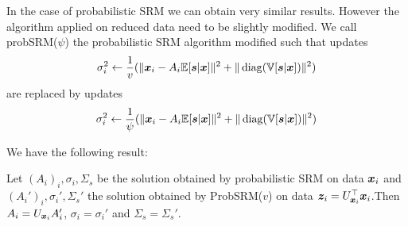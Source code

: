 In the case of probabilistic SRM we can obtain very similar results. However the
algorithm applied on reduced data need to be slightly modified.
We call probSRM($\psi$) the probabilistic SRM algorithm modified such that
updates
\begin{align}
\sigma_i^2 \leftarrow \frac1{v} (\| \boldsymbol{x}_i - A_i \mathbb{E}[\boldsymbol{s}|\boldsymbol{x}]\|^2 + \| \operatorname*{diag}(\mathbb{V}[\boldsymbol{s} | \boldsymbol{x}]) \|^2)
\end{align}
are replaced by updates
\begin{align}
  \sigma_i^2 \leftarrow \frac1{\psi} (\| \boldsymbol{x}_i - A_i \mathbb{E}[\boldsymbol{s}|\boldsymbol{x}]\|^2 + \| \operatorname*{diag}(\mathbb{V}[\boldsymbol{s} | \boldsymbol{x}]) \|^2)
\end{align}

We have the following result:
\begin{prop}
  Let $(A_i)_i, \sigma_i, \Sigma_s$ be the solution obtained by probabilistic SRM on data
  $\boldsymbol{x}_i$ and $(A_i')_i, \sigma_i', \Sigma_s'$ the solution obtained by ProbSRM($v$) on
  data $\boldsymbol{z}_i = U_{\boldsymbol{x}_i}^{\top} \boldsymbol{x}_i$.Then $A_i = U_{\boldsymbol{x}_i}A_i'$, $\sigma_i =
  \sigma_i'$ and $\Sigma_s = \Sigma_s'$. 
  \label{prop:optimalprobsrm}
\end{prop}

